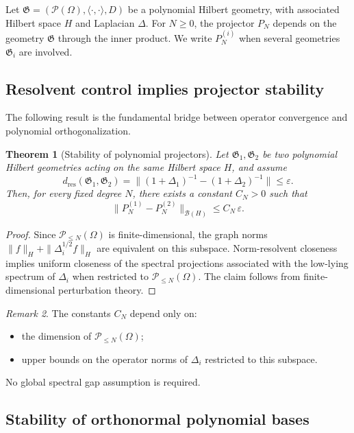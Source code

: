 \documentclass{amsart}
\numberwithin{equation}{section}
\newtheorem{theorem}{Theorem}[section]
\theoremstyle{definition}
\theoremstyle{remark}
\newtheorem{remark}[theorem]{Remark}
\begin{document}
Let $\mathfrak G=(\mathcal P(\Omega),\langle\cdot,\cdot \rangle,D)$ be a polynomial Hilbert geometry,
with associated Hilbert space $H$ and Laplacian $\Delta$.
For $N\ge0$, 
the projector $P_N$ depends on the geometry $\mathfrak G$ through the inner product.
We write $P_N^{(i)}$ when several geometries $\mathfrak G_i$ are involved.

\subsection{Resolvent control implies projector stability}

The following result is the fundamental bridge between operator convergence
and polynomial orthogonalization.

\begin{theorem}[Stability of polynomial projectors]
\label{thm:projector-stability}
Let $\mathfrak G_1,\mathfrak G_2$ be two polynomial Hilbert geometries acting on the same
Hilbert space $H$, and assume
\[
d_{\mathrm{res}}(\mathfrak G_1,\mathfrak G_2)
=
\big\|(1+\Delta_1)^{-1}-(1+\Delta_2)^{-1}\big\|
\le \varepsilon.
\]
Then, for every fixed degree $N$, there exists a constant $C_N>0$ such that
\[
\|P_N^{(1)}-P_N^{(2)}\|_{\mathcal B(H)}
\le C_N\,\varepsilon.
\]
\end{theorem}

\begin{proof}
Since $\mathcal P_{\le N}(\Omega)$ is finite-dimensional, the graph norms
\(
\|f\|_H + \|\Delta_i^{1/2}f\|_H
\)
are equivalent on this subspace.
Norm-resolvent closeness implies uniform closeness of the spectral projections
associated with the low-lying spectrum of $\Delta_i$ when restricted to
$\mathcal P_{\le N}(\Omega)$.
The claim follows from finite-dimensional perturbation theory.
\end{proof}

\begin{remark}
The constants $C_N$ depend only on:
\begin{itemize}
  \item the dimension of $\mathcal P_{\le N}(\Omega)$;
  \item upper bounds on the operator norms of $\Delta_i$ restricted to this subspace.
\end{itemize}
No global spectral gap assumption is required.
\end{remark}

\subsection{Stability of orthonormal polynomial bases}
\end{document}
